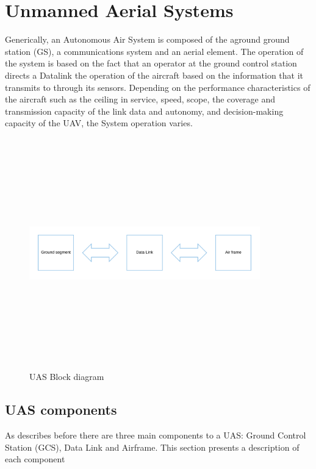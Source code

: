 \section{Unmanned Aerial Systems}
Generically, an Autonomous Air System is composed of the aground ground station (GS), a communications system and an aerial element. The operation of the system is based on the fact that an operator at the ground control station directs a Datalink the operation of the aircraft based on the information that it transmits to through its sensors. Depending on the performance characteristics of the aircraft such as the ceiling in service, speed, scope, the coverage and transmission capacity of the link data and autonomy, and decision-making capacity of the UAV, the System operation varies.\cite{Duran}
\begin{figure}[H]
\centering
\includegraphics[width=10cm,height=10cm,keepaspectratio]{imagenes/UAS_Components.png}
\caption{UAS Block diagram}
\label{fig:block diagram}
\end{figure}

\subsection{UAS components}
As describes before there are three main components to a UAS: Ground Control Station (GCS), Data Link and Airframe. This section presents a description of each component 
